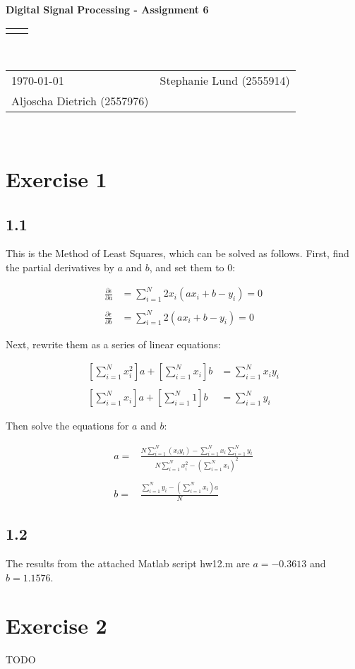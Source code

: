 \documentclass[12pt]{article}
\renewcommand{\title}[1]{\textbf{#1}\\}
\renewcommand{\line}{\begin{tabularx}{\textwidth}{X>{\raggedleft}X}\hline\\\end{tabularx}\\[-0.5cm]}
\newcommand{\leftright}[2]{\begin{tabularx}{\textwidth}{X>{\raggedleft}X}#1%
& #2\\\end{tabularx}\\[-0.5cm]}
\begin{document}
\title{Digital Signal Processing - Assignment 6}
\line
\leftright{\today}{Stephanie Lund (2555914)\\Aljoscha Dietrich (2557976)} %

\section*{Exercise 1}

\subsection*{1.1}
This is the Method of Least Squares, which can be solved as follows. First, find the partial derivatives by $a$ and $b$, and set them to $0$:

\begin{align*}
\frac{\partial \epsilon}{\partial a} &= \sum_{i=1}^N 2x_i(ax_i + b - y_i) = 0 \\\\
\frac{\partial \epsilon}{\partial b} &= \sum_{i=1}^N 2(ax_i + b - y_i) = 0
\end{align*}

Next, rewrite them as a series of linear equations:

\begin{align*}
\left[ \sum_{i=1}^N x_i^2\right]a + \left[ \sum_{i=1}^N x_i\right] b &= \sum_{i=1}^N x_iy_i  \\\\
\left[ \sum_{i=1}^N x_i\right]a + \left[ \sum_{i=1}^N 1\right] b &=  \sum_{i=1}^N y_i
\end{align*}

Then solve the equations for $a$ and $b$:

\begin{align*}
a =& \frac{N \sum_{i=1}^N(x_iy_i) - \sum_{i=1}^Nx_i\sum_{i=1}^Ny_i}{N\sum_{i=1}^Nx_i^2 - \left(\sum_{i=1}^Nx_i\right)^2}
\\ \\
b =& \frac{\sum_{i=1}^Ny_i - \left(\sum_{i=1}^Nx_i\right)a}{N}
\end{align*}

\subsection*{1.2}
The results from the attached Matlab script hw12.m are $a = -0.3613$ and $b = 1.1576$.

\section*{Exercise 2}
TODO
\end{document}
